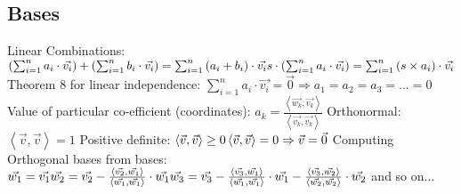 \documentclass[12pt]{article}
\begin{document}
\subsection{Bases}
Linear Combinations:\newline\newline
\begin{math}\left (\sum_{i=1}^{n}a_{i}\cdot\vec{v_{i}}  \right )+\left (\sum_{i=1}^{n}b_{i}\cdot\vec{v_{i}}  \right )=\sum_{i=1}^{n}\left ( a_{i}+b_{i} \right )\cdot\vec{v_{i}}\newline\newline
s\cdot \left ( \sum_{i=1}^{n}a_{i}\cdot \vec{v_{i}} \right )=\sum_{i=1}^{n}\left ( s\times a_{i} \right )\cdot\vec{v_{i}}\end{math}\newline\newline
Theorem 8 for linear independence:\newline
\begin{math}
\sum_{i=1}^{n}a_{i}\cdot\vec{v_{i}}=\vec{0}\Rightarrow a_{1}=a_{2}=a_{3}=...=0
\end{math}\newline\newline
Value of particular co-efficient (coordinates):\newline
\begin{math}
a_{k}=\frac{\left \langle \vec{w_{k}},\vec{v_{k}} \right \rangle}{\left \langle \vec{v_{k}},\vec{v_{k}} \right \rangle}
\end{math}\newline\newline
Orthonormal: \begin{math}\left \langle \vec{v},\vec{v} \right \rangle=1\end{math}\newline\newline
Positive definite:\newline
\begin{math}
\left \langle \vec{v},\vec{v} \right \rangle\geq 0\newline
\left \langle \vec{v},\vec{v} \right \rangle=0\Rightarrow \vec{v}=\vec{0}
\end{math}\newline\newline
Computing Orthogonal bases from bases:\newline
\begin{math}
\vec{w_{1}}=\vec{v_{1}}\newline
\vec{w_{2}}=\vec{v_{2}}-\frac{\left \langle \vec{v_{2}},\vec{w_{1}} \right \rangle}{\left \langle \vec{w_{1}},\vec{w_{1}} \right \rangle}\cdot\vec{w_{1}}\newline
\vec{w_{3}}=\vec{v_{3}}-\frac{\left \langle \vec{v_{3}},\vec{w_{1}} \right \rangle}{\left \langle \vec{w_{1}},\vec{w_{1}} \right \rangle}\cdot\vec{w_{1}}-\frac{\left \langle \vec{v_{3}},\vec{w_{2}} \right \rangle}{\left \langle \vec{w_{2}},\vec{w_{2}} \right \rangle}\cdot\vec{w_{2}}
\end{math}\newline\newline
and so on...
\end{document}
